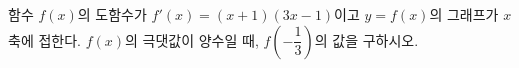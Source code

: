 함수 $f(x)$의 도함수가 $f'(x)=(x+1)(3x-1)$이고 $y=f(x)$의 그래프가 $x$축에 접한다. $f(x)$의 극댓값이 양수일 때, $f\!\left(-\dfrac{1}{3}\right)$의 값을 구하시오.

